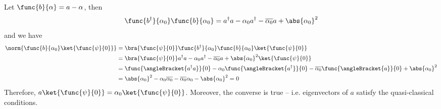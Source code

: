 Let \(\func{b}{\alpha} = a - \alpha\), then 
\begin{equation*}
    \func{b^{\dagger}}{\alpha_0}\func{b}{\alpha_0} = a^{\dagger}a - \alpha_0 a^{\dagger} - \overline{\alpha_0} a + \abs{\alpha_0}^2
\end{equation*}
and we have 
\begin{align*}
    \norm{\func{b}{\alpha_0} \ket{\func{\psi}{0}}} &= \bra{\func{\psi}{0}} \func{b^{\dagger}}{\alpha_0}\func{b}{\alpha_0} \ket{\func{\psi}{0}}\\
    &= \bra{\func{\psi}{0}} a^{\dagger}a - \alpha_0 a^{\dagger} - \overline{\alpha_0} a + \abs{\alpha_0}^2 \ket{\func{\psi}{0}}\\
    &= \func{\angleBracket{a^{\dagger}a}}{0} - \alpha_0 \func{\angleBracket{a^{\dagger}}}{0} - \overline{\alpha_0} \func{\angleBracket{a}}{0} + \abs{\alpha_0}^2\\
    &= \abs{\alpha_0}^2 - \alpha_0 \overline{\alpha_0} - \overline{\alpha_0} \alpha_0 - \abs{\alpha_0}^2 = 0
\end{align*}
Therefore, \(a \ket{\func{\psi}{0}} = \alpha_0 \ket{\func{\psi}{0}}\). Moreover, the converse is true -- i.e. eigenvectors of \(a\) satisfy the quasi-classical conditions. 

